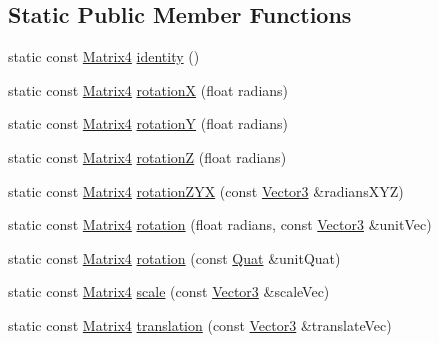 \subsection*{Static Public Member Functions}
\begin{DoxyCompactItemize}
\item 
static const \hyperlink{classVectormath_1_1Aos_1_1Matrix4}{Matrix4} \hyperlink{classVectormath_1_1Aos_1_1Matrix4_aeeda56162e208d53b02d3ec35ac08b86}{identity} ()
\item 
static const \hyperlink{classVectormath_1_1Aos_1_1Matrix4}{Matrix4} \hyperlink{classVectormath_1_1Aos_1_1Matrix4_a8b60f5a84e5799dbb0693051822d36ec}{rotation\-X} (float radians)
\item 
static const \hyperlink{classVectormath_1_1Aos_1_1Matrix4}{Matrix4} \hyperlink{classVectormath_1_1Aos_1_1Matrix4_a6846074690ae127e482c6faea36141f5}{rotation\-Y} (float radians)
\item 
static const \hyperlink{classVectormath_1_1Aos_1_1Matrix4}{Matrix4} \hyperlink{classVectormath_1_1Aos_1_1Matrix4_ac1a41a4c8f65e4b95f28c2ac7fb03ccd}{rotation\-Z} (float radians)
\item 
static const \hyperlink{classVectormath_1_1Aos_1_1Matrix4}{Matrix4} \hyperlink{classVectormath_1_1Aos_1_1Matrix4_a3ae6f957cf2ce1fc489b114e32d0585a}{rotation\-Z\-Y\-X} (const \hyperlink{classVectormath_1_1Aos_1_1Vector3}{Vector3} \&radians\-X\-Y\-Z)
\item 
static const \hyperlink{classVectormath_1_1Aos_1_1Matrix4}{Matrix4} \hyperlink{classVectormath_1_1Aos_1_1Matrix4_ab273a38e96c7f069de2d9abd383bcc43}{rotation} (float radians, const \hyperlink{classVectormath_1_1Aos_1_1Vector3}{Vector3} \&unit\-Vec)
\item 
static const \hyperlink{classVectormath_1_1Aos_1_1Matrix4}{Matrix4} \hyperlink{classVectormath_1_1Aos_1_1Matrix4_ae5cbad3dfd398d6e1a1cfc9f534878c6}{rotation} (const \hyperlink{classVectormath_1_1Aos_1_1Quat}{Quat} \&unit\-Quat)
\item 
static const \hyperlink{classVectormath_1_1Aos_1_1Matrix4}{Matrix4} \hyperlink{classVectormath_1_1Aos_1_1Matrix4_ab1df40d4ed35a1eaaed3c4e80b9c389c}{scale} (const \hyperlink{classVectormath_1_1Aos_1_1Vector3}{Vector3} \&scale\-Vec)
\item 
static const \hyperlink{classVectormath_1_1Aos_1_1Matrix4}{Matrix4} \hyperlink{classVectormath_1_1Aos_1_1Matrix4_ac308643c557108ab55bf98835accdfc8}{translation} (const \hyperlink{classVectormath_1_1Aos_1_1Vector3}{Vector3} \&translate\-Vec)
\item 

\end{DoxyCompactItemize}

